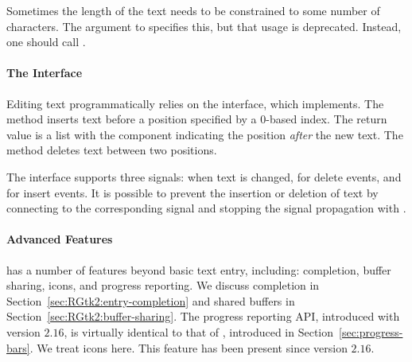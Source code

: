 Sometimes the length of the text needs to be constrained to some
number of characters. The  argument to
 specifies this, but that usage is
deprecated. Instead, one should call .

\paragraph{The  Interface}

Editing text programmatically relies on the 
interface, which  implements. The method
 inserts text before a position
specified by a $0$-based index. The return value is a list with the
component  indicating the position \textit{after} the
new text. The  method deletes text
between two positions.


The  interface supports three signals:
 when text is changed,  for delete
events, and  for insert events. It is possible to
prevent the insertion or deletion of text by connecting to the
corresponding signal and stopping the signal propagation with
. 

\paragraph{Advanced  Features}

 has a number of features beyond basic text entry,
including: completion, buffer sharing, icons, and progress
reporting. We discuss completion in
Section~\ref{sec:RGtk2:entry-completion} and shared buffers in
Section~\ref{sec:RGtk2:buffer-sharing}. The progress reporting API,
introduced with version $2.16$, is virtually identical to that of
, introduced in
Section~\ref{sec:progress-bars}. We treat icons here. This feature has
been present since version $2.16$.

